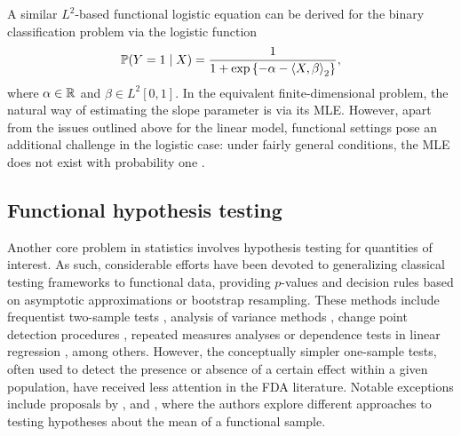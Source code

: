 A similar \(L^2\)-based functional logistic equation can be derived for the binary classification problem via the logistic function
\begin{equation}\label{eq:l2-logistic-model}
  \mathbb{P}(Y=1 \mid X) = \frac{1}{1 + \exp\left\{-\alpha - \left\langle X,\beta\right\rangle_2\right\}},
\end{equation}
where \(\alpha \in \mathbb{R}\) and \(\beta \in L^2[0, 1]\). In the equivalent finite-dimensional problem, the natural way of estimating the slope parameter is via its \acf{MLE}. However, apart from the issues outlined above for the linear model, functional settings pose an additional challenge in the logistic case: under fairly general conditions, the \acs{MLE} does not exist with probability one \citep[see][]{berrendero2023functional}.

\subsection{Functional hypothesis testing}

Another core problem in statistics involves hypothesis testing for quantities of interest. As such, considerable efforts have been devoted to generalizing classical testing frameworks to functional data, providing \(p\)-values and decision rules based on asymptotic approximations or bootstrap resampling. These methods include frequentist two-sample tests \citep{fan1998test,hall2007two,zhang2010two}, analysis of variance methods \citep{cuevas2004anova, cuesta2010simple, zhang2013analysis}, change point detection procedures \citep{berkes2009detecting,hormann2010weakly}, repeated measures analyses \citep{martinez2011repeated,smaga2020note} or dependence tests in linear regression \citep{cardot2003testing,kokoszka2008testing}, among others. However, the conceptually simpler one-sample tests, often used to detect the presence or absence of a certain effect within a given population, have received less attention in the \acs{FDA} literature. Notable exceptions include proposals by \citet{mas2007testing}, \citet{munk2008one} and \citet{zhang2013analysis}, where the authors explore different approaches to testing hypotheses about the mean of a functional sample.

